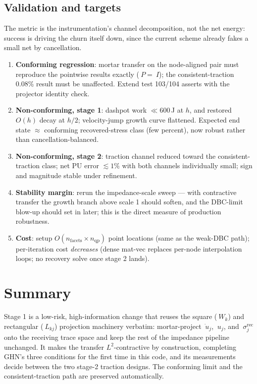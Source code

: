 \documentclass[11pt]{article}
\begin{document}
\subsection{Validation and targets}

The metric is the instrumentation's channel decomposition, not the net
energy: success is driving the churn itself down, since the current
scheme already fakes a small net by cancellation.

\begin{enumerate}
\item \textbf{Conforming regression}: mortar transfer on the
      node-aligned pair must reproduce the pointwise results exactly
      ($~P = ~I$); the consistent-traction 0.08\% result must be
      unaffected.  Extend test 103/104 asserts with the projector
      identity check.
\item \textbf{Non-conforming, stage 1}: dashpot work
      $\ll 600$\,J at $h$, and restored $O(h)$ decay at $h/2$;
      velocity-jump growth curve flattened.  Expected end state
      $\approx$ conforming recovered-stress class (few percent), now
      robust rather than cancellation-balanced.
\item \textbf{Non-conforming, stage 2}: traction channel reduced
      toward the consistent-traction class; net PU error
      $\lesssim 1$\% with both channels individually small; sign and
      magnitude stable under refinement.
\item \textbf{Stability margin}: rerun the impedance-scale sweep ---
      with contractive transfer the growth branch above scale 1 should
      soften, and the DBC-limit blow-up should set in later; this is
      the direct measure of production robustness.
\item \textbf{Cost}: setup $O(n_{\mathrm{facets}} \times n_{\mathrm{qp}})$
      point locations (same as the weak-DBC path); per-iteration cost
      \emph{decreases} (dense mat-vec replaces per-node interpolation
      loops; no recovery solve once stage 2 lands).
\end{enumerate}

\section{Summary}

Stage 1 is a low-risk, high-information change that reuses the square
($~W_k$) and rectangular ($~L_{kj}$) projection machinery verbatim:
mortar-project $\dot{~u}_j$, $~u_j$, and $~\sigma_j^{\mathrm{rec}}$
onto the receiving trace space and keep the rest of the impedance
pipeline unchanged.  It makes the transfer $L^2$-contractive by
construction, completing GHN's three conditions for the first time in
this code, and its measurements decide between the two stage-2
traction designs.  The conforming limit and the consistent-traction
path are preserved automatically.
\end{document}
